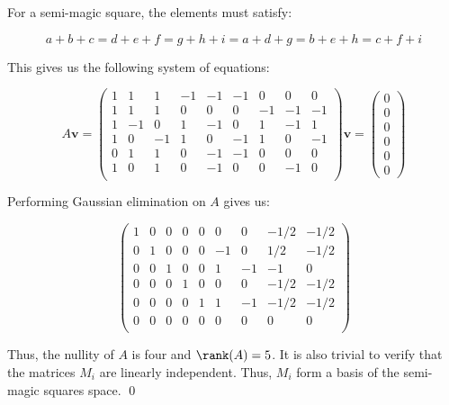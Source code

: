 \documentclass[12pt]{article}
\begin{document}
For a semi-magic square, the elements must satisfy:

\begin{equation}
    a + b + c = d + e + f = g + h + i = a + d + g = b + e + h = c + f + i
\end{equation}

This gives us the following system of equations:

\begin{equation}
    A \mathbf{v} =
    \begin{pmatrix}
        1 & 1  & 1  & -1 & -1 & -1 & 0  & 0  & 0  \\
        1 & 1  & 1  & 0  & 0  & 0  & -1 & -1 & -1 \\
        1 & -1 & 0  & 1  & -1 & 0  & 1  & -1 & 1  \\
        1 & 0  & -1 & 1  & 0  & -1 & 1  & 0  & -1 \\
        0 & 1  & 1  & 0  & -1 & -1 & 0  & 0  & 0  \\
        1 & 0  & 1  & 0  & -1 & 0  & 0  & -1 & 0  \\
    \end{pmatrix}
    \mathbf{v}
    =
    \begin{pmatrix}
        0 \\
        0 \\
        0 \\
        0 \\
        0 \\
        0
    \end{pmatrix}
\end{equation}

Performing Gaussian elimination on $A$ gives us:

\begin{equation}
    \begin{pmatrix}
        1 & 0 & 0 & 0 & 0 & 0  & 0  & -1/2 & -1/2 \\
        0 & 1 & 0 & 0 & 0 & -1 & 0  & 1/2  & -1/2 \\
        0 & 0 & 1 & 0 & 0 & 1  & -1 & -1   & 0    \\
        0 & 0 & 0 & 1 & 0 & 0  & 0  & -1/2 & -1/2 \\
        0 & 0 & 0 & 0 & 1 & 1  & -1 & -1/2 & -1/2 \\
        0 & 0 & 0 & 0 & 0 & 0  & 0  & 0    & 0    \\
    \end{pmatrix}
\end{equation}

Thus, the nullity of $A$ is four and $\rank(A) = 5$. It is also trivial to verify that the matrices $M_{i}$ are linearly independent. Thus, $M_{i}$ form a basis of the semi-magic squares space.
\qed
\end{document}
